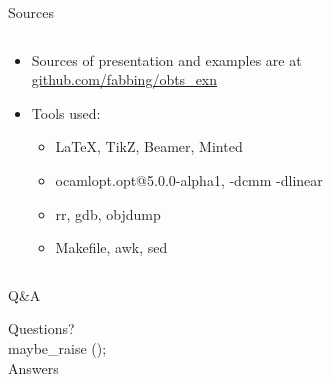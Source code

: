 \begin{frame}{Sources}
  \begin{columns}[c]
    \begin{column}{0.4\textwidth}
      \begin{itemize}
        \item Sources of presentation and examples are at \href{https://github.com/fabbing/obts\_exn}{github.com/fabbing/obts\_exn}
        \item Tools used:
          \begin{itemize}
            \item LaTeX, TikZ, Beamer, Minted
            \item ocamlopt.opt@5.0.0-alpha1, -dcmm -dlinear
            \item rr, gdb, objdump
            \item Makefile, awk, sed
          \end{itemize}
      \end{itemize}
    \end{column}
    \begin{column}{0.6\textwidth}
      \centering
    \end{column}
  \end{columns}
\end{frame}

\begin{frame}{Q\&A}
  \begin{center}
    \large Questions?\\
    \smallskip
    \large maybe\_raise ();\\
    \large Answers\\
  \end{center}
\end{frame}
